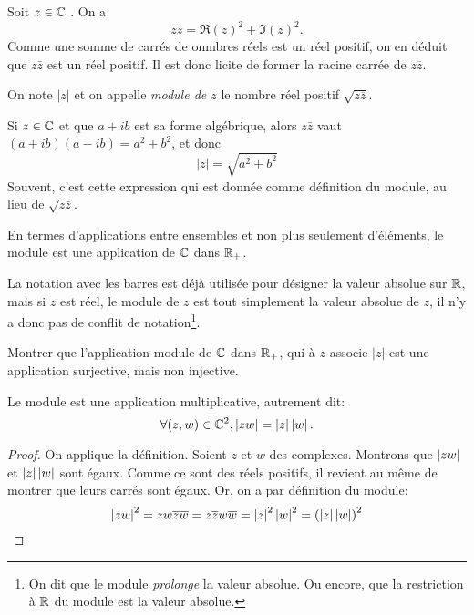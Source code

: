 
Soit $z \in\mathbb{C}$ . On a 
\[z\overline z = \Re(z)^2 + \Im(z)^2.\]
Comme une somme de carrés de onmbres réels est un réel positif, on en déduit que $z\bar z$ est un réel positif. Il est donc licite de former la racine carrée de $z\overline z$.

\begin{definition}
On note $|z|$ et on appelle \emph{module de $z$} le nombre réel positif $\sqrt{z\overline z}$. 
\end{definition}


\begin{remarque}
Si $z\in \mathbb{C}$ et que $a+ib$ est sa forme algébrique, alors $z\bar z$ vaut $(a+ib)(a-ib)=a^2+b^2$, et donc 
\[ |z|=\sqrt{a^2+b^2}\]
Souvent, c'est cette expression qui est donnée comme définition du module, au lieu de $\sqrt{z\bar z}$.
\end{remarque}

En termes d'applications entre ensembles et non plus seulement d'éléments, le module est une application de $\mathbb{C}$ dans $\mathbb{R}_+$.

La notation avec les barres est déjà utilisée pour désigner la valeur absolue sur $\mathbb{R}$, mais si $z$ est réel, le module de $z$ est tout simplement la valeur absolue de $z$, il n'y a donc pas de conflit de notation\footnote{On dit que le module \emph{prolonge} la valeur absolue. Ou encore, que la restriction à $\mathbb{R}$ du module est la valeur absolue.}. 


\begin{exo}
Montrer que l'application \og module\fg{} de $\mathbb{C}$ dans $\mathbb{R}_+$, qui à $z$ associe $|z|$ est une application surjective, mais non injective.
\end{exo}

\begin{proposition}
Le module est une application multiplicative, autrement dit:
\[ \forall (z,w)\in\mathbb{C}^2, \left\lvert z w\right\rvert=\left\lvert z\right\rvert \left\lvert w\right\rvert.\]
\end{proposition}
\begin{proof}
On applique la définition. Soient $z$ et $w$ des complexes. Montrons que $\left\lvert z w\right\rvert$ et $\left\lvert z\right\rvert \left\lvert w\right\rvert$ sont égaux. Comme ce sont des réels positifs, il revient au même de montrer que leurs carrés sont égaux. Or, on a par définition du module:
\[
\left\lvert zw\right\rvert^2 
= zw\overline{zw} 
= z\overline z w\overline w 
= \left\lvert z\right\rvert^2 \left\lvert w\right\rvert^2 
= \left(\left\lvert z\right\rvert\left\lvert w\right\rvert\right)^2 
\]
\end{proof}

